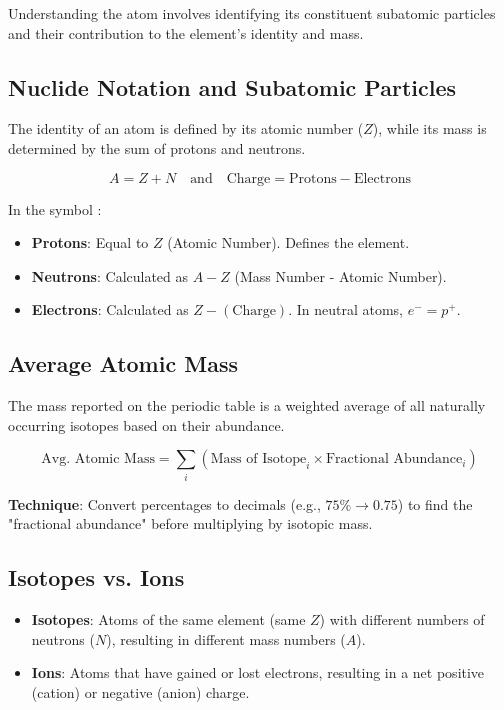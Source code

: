 \documentclass[11pt]{article}
\begin{document}
Understanding the atom involves identifying its constituent subatomic particles and their contribution to the element's identity and mass.

\subsection{Nuclide Notation and Subatomic Particles}
The identity of an atom is defined by its atomic number ($Z$), while its mass is determined by the sum of protons and neutrons.
\begin{tcolorbox}[memorize]
    \[ A = Z + N \quad \text{and} \quad \text{Charge} = \text{Protons} - \text{Electrons} \]
\end{tcolorbox}
In the symbol :
\begin{itemize}
    \item \textbf{Protons}: Equal to $Z$ (Atomic Number). Defines the element.
    \item \textbf{Neutrons}: Calculated as $A - Z$ (Mass Number - Atomic Number).
    \item \textbf{Electrons}: Calculated as $Z - (\text{Charge})$. In neutral atoms, $e^- = p^+$.
\end{itemize}

\subsection{Average Atomic Mass}
The mass reported on the periodic table is a weighted average of all naturally occurring isotopes based on their abundance.
\begin{tcolorbox}[memorize]
    \[ \text{Avg. Atomic Mass} = \sum_{i} (\text{Mass of Isotope}_i \times \text{Fractional Abundance}_i) \]
\end{tcolorbox}
\textbf{Technique}: Convert percentages to decimals (e.g., $75\% \rightarrow 0.75$) to find the "fractional abundance" before multiplying by isotopic mass.

\subsection{Isotopes vs. Ions}
\begin{itemize}
    \item \textbf{Isotopes}: Atoms of the same element (same $Z$) with different numbers of neutrons ($N$), resulting in different mass numbers ($A$).
    \item \textbf{Ions}: Atoms that have gained or lost electrons, resulting in a net positive (cation) or negative (anion) charge.
\end{itemize}
\end{document}
